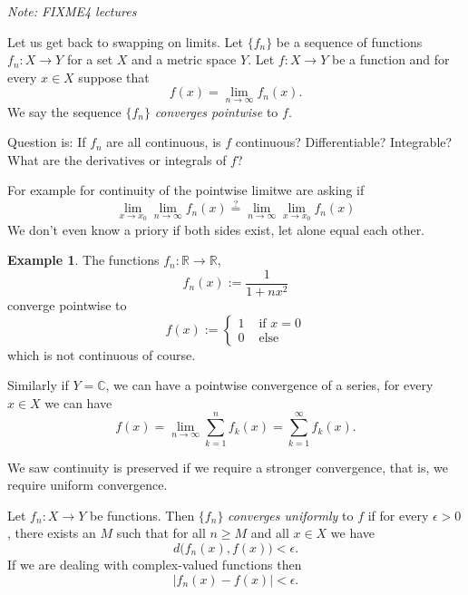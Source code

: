 \documentclass[12pt]{book}
\newcommand{\abs}[1]{\left\lvert {#1} \right\rvert}
\newcommand{\C}{{\mathbb{C}}}
\newcommand{\R}{{\mathbb{R}}}
\newcommand{\sectionnotes}[1]{\noindent \emph{Note: #1} \medskip \par}
\theoremstyle{plain}
\theoremstyle{remark}
\theoremstyle{definition}
\theoremstyle{exercise}
\theoremstyle{example}
\newtheorem{example}[thm]{Example}
\begin{document}
\sectionnotes{FIXME4 lectures}

Let us get back to swapping on limits.  Let $\{ f_n \}$ be a sequence
of functions $f_n \colon X \to Y$ for a set $X$ and a metric space $Y$.
Let $f \colon X \to Y$ be a
function and for every $x \in X$ suppose that
\begin{equation*}
f(x) = \lim_{n\to \infty} f_n(x) .
\end{equation*}
We say the sequence $\{ f_n \}$ \emph{converges pointwise} to
$f$.

Question is:
If $f_n$ are all continuous, is $f$ continuous?  Differentiable?
Integrable?  What are the derivatives or integrals of $f$?

For example for continuity of the pointwise limitwe are asking if
\begin{equation*}
\lim_{x\to x_0} \lim_{n\to\infty} f_n(x)
\overset{?}{=}
\lim_{n\to\infty} \lim_{x\to x_0} f_n(x)
\end{equation*}
We don't even know a priory if both sides exist, let alone equal each other.

\begin{example}
The functions $f_n \colon \R \to \R$,
\begin{equation*}
f_n(x) := \frac{1}{1+nx^2}
\end{equation*}
converge pointwise to
\begin{equation*}
f(x) := 
\begin{cases}
1 & \text{ if $x=0$} \\
0 & \text{ else}
\end{cases}
\end{equation*}
which is not continuous of course.
\end{example}

Similarly if $Y=\C$, we can have a pointwise convergence of a series,
for every $x \in X$ we can have
\begin{equation*}
f(x) = \lim_{n\to \infty} \sum_{k=1}^n f_k(x) =
\sum_{k=1}^\infty f_k(x) .
\end{equation*}

We saw continuity is preserved if we require a stronger convergence,
that is, we require uniform convergence.

Let $f_n \colon X \to Y$ be functions.  Then
$\{f_n\}$ \emph{converges uniformly} to $f$ if
for every $\epsilon > 0$, there exists an $M$ such that
for all $n \geq M$ and all $x \in X$ we have
\begin{equation*}
d\bigl(f_n(x),f(x)\bigr) < \epsilon .
\end{equation*}
If we are dealing with complex-valued functions then
\begin{equation*}
\abs{f_n(x)-f(x)} < \epsilon .
\end{equation*}
\end{document}
